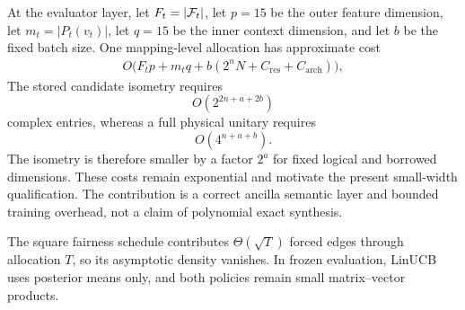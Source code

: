 At the evaluator layer, let $F_t=|\mathcal{F}_t|$, let $p=15$ be the outer feature dimension, let $m_t=|P_t(v_t)|$, let $q=15$ be the inner context dimension, and let $b$ be the fixed batch size.  One mapping-level allocation has approximate cost
\begin{equation}
\begin{aligned}
O\!\bigl(F_tp+m_tq+b(2^nN+C_{\mathrm{res}}+C_{\mathrm{arch}})\bigr),
\end{aligned}
\label{eq:allocation-cost}
\end{equation}
The stored candidate isometry requires
\begin{equation}
O\!\left(2^{2n+a+2b}\right)
\end{equation}
complex entries, whereas a full physical unitary requires
\begin{equation}
O\!\left(4^{n+a+b}\right).
\end{equation}
The isometry is therefore smaller by a factor $2^a$ for fixed logical and borrowed dimensions. These costs remain exponential and motivate the present small-width qualification. The contribution is a correct ancilla semantic layer and bounded training overhead, not a claim of polynomial exact synthesis.

The square fairness schedule contributes $\Theta(\sqrt T)$ forced edges through allocation $T$, so its asymptotic density vanishes. In frozen evaluation, LinUCB uses posterior means only, and both policies remain small matrix--vector products.
